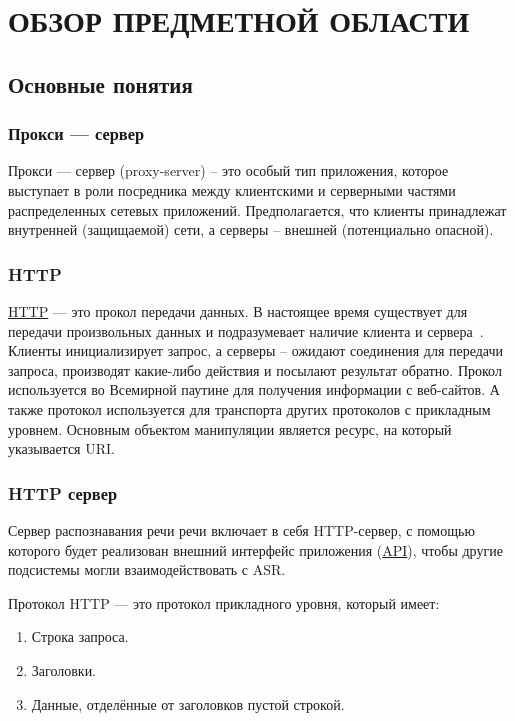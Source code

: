 
\chapter{ОБЗОР ПРЕДМЕТНОЙ ОБЛАСТИ}

\section{Основные понятия}

\subsection{Прокси --- сервер}
Прокси --- сервер (proxy-server) – это особый тип приложения, которое
выступает в роли посредника между клиентскими и серверными частями
распределенных сетевых приложений. Предполагается, что клиенты принадлежат
внутренней (защищаемой) сети, а серверы – внешней (потенциально опасной).

\subsection{HTTP}
\hyperlink{http}{HTTP} --- это прокол передачи данных. В настоящее время существует для передачи
произвольных данных и подразумевает наличие клиента и сервера~\cite{http}.
Клиенты инициализирует запрос, а серверы – ожидают соединения для передачи
запроса, производят какие-либо действия и посылают результат обратно. Прокол
используется во Всемирной паутине для получения информации с веб-сайтов. А
также протокол используется для транспорта других протоколов с прикладным
уровнем. Основным объектом манипуляции является ресурс, на который указывается URI.

\subsection{HTTP сервер}
Сервер распознавания речи речи включает в себя HTTP-сервер, с помощью которого
будет реализован внешний интерфейс приложения (\hyperlink{api}{API}), чтобы другие
подсистемы могли взаимодействовать с ASR.

Протокол HTTP --- это протокол прикладного уровня, который имеет:
\begin{enumerate}
    \item Строка запроса.
    \item Заголовки.
    \item Данные, отделённые от заголовков пустой строкой.
\end{enumerate}

